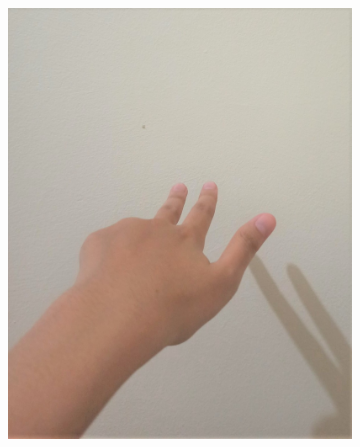 \documentclass[conference]{IEEEtran}
\begin{document}
\begin{figure} [h]
\begin{center}
\begin{subfigure}[t]{0.11\textwidth}
				\includegraphics[width=\textwidth]{img/pola3a.jpg}
				\caption{\label{fig:gs3a}}
			\end{subfigure}
			\hspace{0.1em}
			\begin{subfigure}[t]{0.11\textwidth}

\end{subfigure}
\end{center}
\end{figure}
\end{document}
